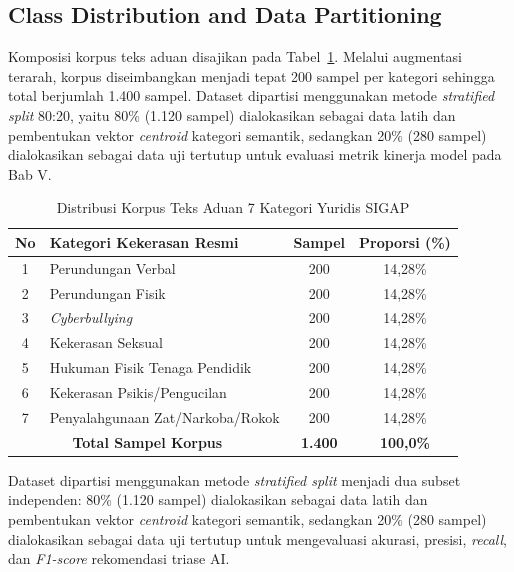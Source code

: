 \documentclass[conference]{IEEEtran}
\begin{document}
\subsection{Class Distribution and Data Partitioning}

Komposisi korpus teks aduan disajikan pada Tabel~\ref{tab:dataset}. Melalui augmentasi terarah, korpus diseimbangkan menjadi tepat 200 sampel per kategori sehingga total berjumlah 1.400 sampel. Dataset dipartisi menggunakan metode \textit{stratified split} 80:20, yaitu 80\% (1.120 sampel) dialokasikan sebagai data latih dan pembentukan vektor \textit{centroid} kategori semantik, sedangkan 20\% (280 sampel) dialokasikan sebagai data uji tertutup untuk evaluasi metrik kinerja model pada Bab V.

\begin{table}[htbp]
\caption{Distribusi Korpus Teks Aduan 7 Kategori Yuridis SIGAP}
\label{tab:dataset}
\begin{center}
\begin{tabular}{|c|p{3.4cm}|c|c|}
\hline
\textbf{No} & \textbf{Kategori Kekerasan Resmi} & \textbf{Sampel} & \textbf{Proporsi (\%)} \\
\hline
1 & Perundungan Verbal & 200 & 14,28\% \\
\hline
2 & Perundungan Fisik & 200 & 14,28\% \\
\hline
3 & \textit{Cyberbullying} & 200 & 14,28\% \\
\hline
4 & Kekerasan Seksual & 200 & 14,28\% \\
\hline
5 & Hukuman Fisik Tenaga Pendidik & 200 & 14,28\% \\
\hline
6 & Kekerasan Psikis/Pengucilan & 200 & 14,28\% \\
\hline
7 & Penyalahgunaan Zat/Narkoba/Rokok & 200 & 14,28\% \\
\hline
\multicolumn{2}{|c|}{\textbf{Total Sampel Korpus}} & \textbf{1.400} & \textbf{100,0\%} \\
\hline
\end{tabular}
\end{center}
\end{table}

Dataset dipartisi menggunakan metode \textit{stratified split} menjadi dua subset independen: 80\% (1.120 sampel) dialokasikan sebagai data latih dan pembentukan vektor \textit{centroid} kategori semantik, sedangkan 20\% (280 sampel) dialokasikan sebagai data uji tertutup untuk mengevaluasi akurasi, presisi, \textit{recall}, dan \textit{F1-score} rekomendasi triase AI.
\end{document}
